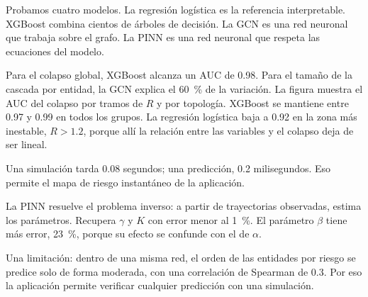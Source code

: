 \begin{decir}
Probamos cuatro modelos. La regresión logística es la referencia interpretable. XGBoost
combina cientos de árboles de decisión. La GCN es una red neuronal que trabaja sobre el
grafo. La PINN es una red neuronal que respeta las ecuaciones del modelo.

Para el colapso global, XGBoost alcanza un AUC de 0.98. Para el tamaño de la cascada
por entidad, la GCN explica el 60~\% de la variación. La figura muestra el AUC del
colapso por tramos de $R$ y por topología. XGBoost se mantiene entre 0.97 y 0.99 en todos
los grupos. La regresión logística baja a 0.92 en la zona más inestable, $R>1.2$, porque
allí la relación entre las variables y el colapso deja de ser lineal.

Una simulación tarda 0.08 segundos; una predicción, 0.2 milisegundos. Eso permite el
mapa de riesgo instantáneo de la aplicación.

La PINN resuelve el problema inverso: a partir de trayectorias observadas, estima los
parámetros. Recupera $\gamma$ y $K$ con error menor al 1~\%. El parámetro $\beta$ tiene
más error, 23~\%, porque su efecto se confunde con el de $\alpha$.

Una limitación: dentro de una misma red, el orden de las entidades por riesgo se predice
solo de forma moderada, con una correlación de Spearman de 0.3. Por eso la aplicación
permite verificar cualquier predicción con una simulación.
\end{decir}

